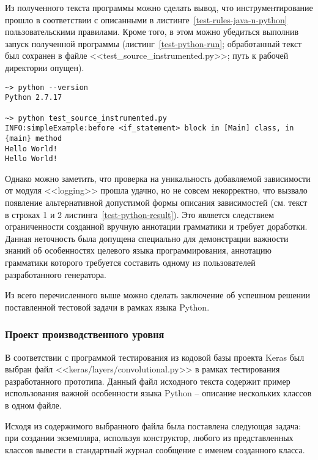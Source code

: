 Из полученного текста программы можно сделать вывод, что инструментирование прошло в соответствии с описанными в листинге~\ref{test-rules-java-n-python} пользовательскими правилами.
Кроме того, в этом можно убедиться выполнив запуск полученной программы (листинг~\ref{test-python-run}; обработанный текст был сохранен в файле <<test\_source\_instrumented.py>>; путь к рабочей директории опущен).

\begin{lstlisting}[frame=single, label={test-python-run}, caption={Результаты запуска обработанного тестового приложения.}]
~> python --version
Python 2.7.17

~> python test_source_instrumented.py
INFO:simpleExample:before <if_statement> block in [Main] class, in {main} method
Hello World!
Hello World!
\end{lstlisting}

Однако можно заметить, что проверка на уникальность добавляемой зависимости от модуля <<logging>> прошла удачно, но не совсем некорректно, что вызвало появление альтернативной допустимой формы описания зависимостей (см. текст в строках 1 и 2 листинга~\ref{test-python-result}).
Это является следствием ограниченности созданной вручную аннотации грамматики и требует доработки.
Данная неточность была допущена специально для демонстрации важности знаний об особенностях целевого языка программирования, аннотацию грамматики которого требуется составить одному из пользователей разработанного генератора.

Из всего перечисленного выше можно сделать заключение об успешном решении поставленной тестовой задачи в рамках языка Python.

\subsubsection{Проект производственного уровня}

В соответствии с программой тестирования из кодовой базы проекта Keras был выбран файл <<keras/layers/convolutional.py>> в рамках тестирования разработанного прототипа.
Данный файл исходного текста содержит пример использования важной особенности языка Python -- описание нескольких классов в одном файле.

Исходя из содержимого выбранного файла была поставлена следующая задача:
при создании экземпляра, используя конструктор, любого из представленных классов вывести в стандартный журнал сообщение с именем созданного класса.

